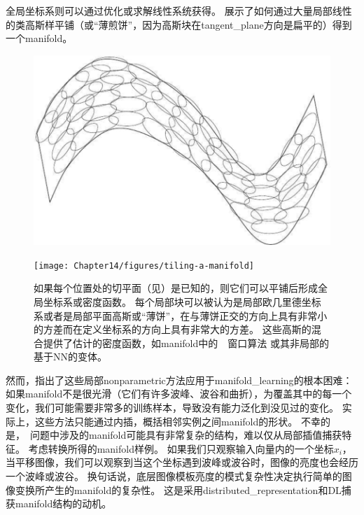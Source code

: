 全局坐标系则可以通过优化或求解线性系统获得。
展示了如何通过大量局部线性的类高斯样平铺（或``薄煎饼''，因为高斯块在\gls{tangent_plane}方向是扁平的）得到一个\gls{manifold}。

\begin{figure}[!htb]
\ifOpenSource
\centerline{\includegraphics[scale=0.5]{images/126.png}}
\else
\centerline{\texttt{[image: Chapter14/figures/tiling-a-manifold]}}
\fi
\caption{如果每个位置处的切平面（见）是已知的，则它们可以平铺后形成全局坐标系或密度函数。
每个局部块可以被认为是局部欧几里德坐标系或者是局部平面高斯或``薄饼''，在与薄饼正交的方向上具有非常小的方差而在定义坐标系的方向上具有非常大的方差。
这些高斯的混合提供了估计的密度函数，如\gls{manifold}中的~~窗口算法\citep{Vincent-Bengio-2003-short} 或其非局部的基于\gls{NN}的变体\citep{Bengio+Monperrus-2005}。
}
\label{fig:chap14_tiling-a-manifold}
\end{figure}

然而，\citet{Bengio+Monperrus-2005}指出了这些局部\gls{nonparametric}方法应用于\gls{manifold_learning}的根本困难：如果\gls{manifold}不是很光滑（它们有许多波峰、波谷和曲折），为覆盖其中的每一个变化，我们可能需要非常多的训练样本，导致没有能力泛化到没见过的变化。
实际上，这些方法只能通过内插，概括相邻实例之间\gls{manifold}的形状。
不幸的是，~问题中涉及的\gls{manifold}可能具有非常复杂的结构，难以仅从局部插值捕获特征。
考虑转换所得的\gls{manifold}样例。
如果我们只观察输入向量内的一个坐标$x_i$，当平移图像，我们可以观察到当这个坐标遇到波峰或波谷时，图像的亮度也会经历一个波峰或波谷。
换句话说，底层图像模板亮度的模式复杂性决定执行简单的图像变换所产生的\gls{manifold}的复杂性。
这是采用\gls{distributed_representation}和\gls{DL}捕获\gls{manifold}结构的动机。

